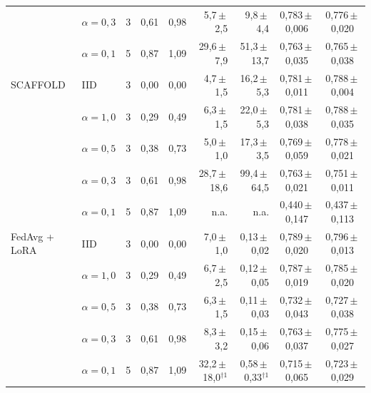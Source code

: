 \begin{table}[t]
{\begin{tabular}{llcccrrcc}
 & $\alpha=0{,}3$ & 3 & 0{,}61 & 0{,}98 & 5{,}7\,$\pm$\,2{,}5 & 9{,}8\,$\pm$\,4{,}4 & 0{,}783\,$\pm$\,0{,}006 & 0{,}776\,$\pm$\,0{,}020 \\
 & $\alpha=0{,}1$ & 5 & 0{,}87 & 1{,}09 & 29{,}6\,$\pm$\,7{,}9 & 51{,}3\,$\pm$\,13{,}7 & 0{,}763\,$\pm$\,0{,}035 & 0{,}765\,$\pm$\,0{,}038 \\
\midrule
SCAFFOLD & IID & 3 & 0{,}00 & 0{,}00 & 4{,}7\,$\pm$\,1{,}5 & 16{,}2\,$\pm$\,5{,}3 & 0{,}781\,$\pm$\,0{,}011 & 0{,}788\,$\pm$\,0{,}004 \\
 & $\alpha=1{,}0$ & 3 & 0{,}29 & 0{,}49 & 6{,}3\,$\pm$\,1{,}5 & 22{,}0\,$\pm$\,5{,}3 & 0{,}781\,$\pm$\,0{,}038 & 0{,}788\,$\pm$\,0{,}035 \\
 & $\alpha=0{,}5$ & 3 & 0{,}38 & 0{,}73 & 5{,}0\,$\pm$\,1{,}0 & 17{,}3\,$\pm$\,3{,}5 & 0{,}769\,$\pm$\,0{,}059 & 0{,}778\,$\pm$\,0{,}021 \\
 & $\alpha=0{,}3$ & 3 & 0{,}61 & 0{,}98 & 28{,}7\,$\pm$\,18{,}6 & 99{,}4\,$\pm$\,64{,}5 & 0{,}763\,$\pm$\,0{,}021 & 0{,}751\,$\pm$\,0{,}011 \\
 & $\alpha=0{,}1$ & 5 & 0{,}87 & 1{,}09 & n.a. & n.a. & 0{,}440\,$\pm$\,0{,}147 & 0{,}437\,$\pm$\,0{,}113 \\
\midrule
FedAvg + LoRA & IID & 3 & 0{,}00 & 0{,}00 & 7{,}0\,$\pm$\,1{,}0 & 0{,}13\,$\pm$\,0{,}02 & 0{,}789\,$\pm$\,0{,}020 & 0{,}796\,$\pm$\,0{,}013 \\
 & $\alpha=1{,}0$ & 3 & 0{,}29 & 0{,}49 & 6{,}7\,$\pm$\,2{,}5 & 0{,}12\,$\pm$\,0{,}05 & 0{,}787\,$\pm$\,0{,}019 & 0{,}785\,$\pm$\,0{,}020 \\
 & $\alpha=0{,}5$ & 3 & 0{,}38 & 0{,}73 & 6{,}3\,$\pm$\,1{,}5 & 0{,}11\,$\pm$\,0{,}03 & 0{,}732\,$\pm$\,0{,}043 & 0{,}727\,$\pm$\,0{,}038 \\
 & $\alpha=0{,}3$ & 3 & 0{,}61 & 0{,}98 & 8{,}3\,$\pm$\,3{,}2 & 0{,}15\,$\pm$\,0{,}06 & 0{,}763\,$\pm$\,0{,}037 & 0{,}775\,$\pm$\,0{,}027 \\
 & $\alpha=0{,}1$ & 5 & 0{,}87 & 1{,}09 & 32{,}2\,$\pm$\,18{,}0$^{\dagger1}$ & 0{,}58\,$\pm$\,0{,}33$^{\dagger1}$ & 0{,}715\,$\pm$\,0{,}065 & 0{,}723\,$\pm$\,0{,}029 \\
\bottomrule
\end{tabular}}
\end{table}
